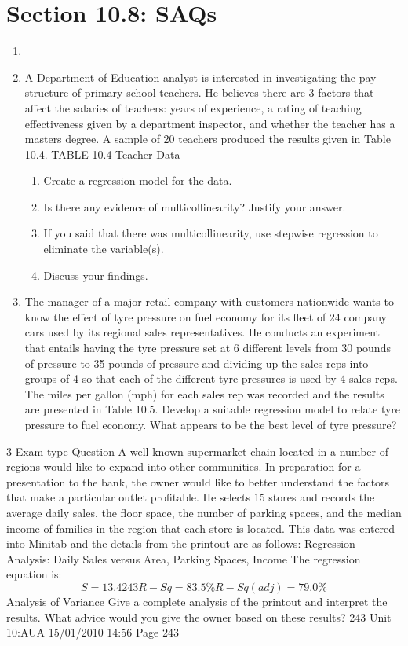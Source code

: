\documentclass[]{report}
\begin{document}
\section{Section 10.8: SAQs}
\begin{enumerate}
	\item 

\item A Department of Education analyst is interested in investigating the pay structure
of primary school teachers. He believes there are 3 factors that affect the salaries
of teachers: years of experience, a rating of teaching effectiveness given by a
department inspector, and whether the teacher has a masters degree. A sample
of 20 teachers produced the results given in Table 10.4.
TABLE 10.4 Teacher Data
\begin{enumerate}
\item Create a regression model for the data.
\item Is there any evidence of multicollinearity? Justify your answer.
\item If you said that there was multicollinearity, use stepwise regression to
eliminate the variable(s).
\item Discuss your findings.
\end{enumerate}
\item The manager of a major retail company with customers nationwide wants to
know the effect of tyre pressure on fuel economy for its fleet of 24 company
cars used by its regional sales representatives. He conducts an experiment that
entails having the tyre pressure set at 6 different levels from 30 pounds of
pressure to 35 pounds of pressure and dividing up the sales reps into groups of
4 so that each of the different tyre pressures is used by 4 sales reps. The miles
per gallon (mph) for each sales rep was recorded and the results are presented
in Table 10.5.
Develop a suitable regression model to relate tyre pressure to fuel economy. What
appears to be the best level of tyre pressure?
\end{enumerate}
3 Exam-type Question
A well known supermarket chain located in a number of regions would like to
expand into other communities. In preparation for a presentation to the bank, the
owner would like to better understand the factors that make a particular outlet
profitable. He selects 15 stores and records the average daily sales, the floor
space, the number of parking spaces, and the median income of families in the
region that each store is located. This data was entered into Minitab and the
details from the printout are as follows:
Regression Analysis: Daily Sales versus Area, Parking Spaces, Income
The regression equation is:
\[S = 13.4243 R-Sq = 83.5\% R-Sq (adj) = 79.0\%\]
Analysis of Variance
Give a complete analysis of the printout and interpret the results.
What advice would you give the owner based on these results?
243
Unit 10:AUA 15/01/2010 14:56 Page 243
\end{document}

